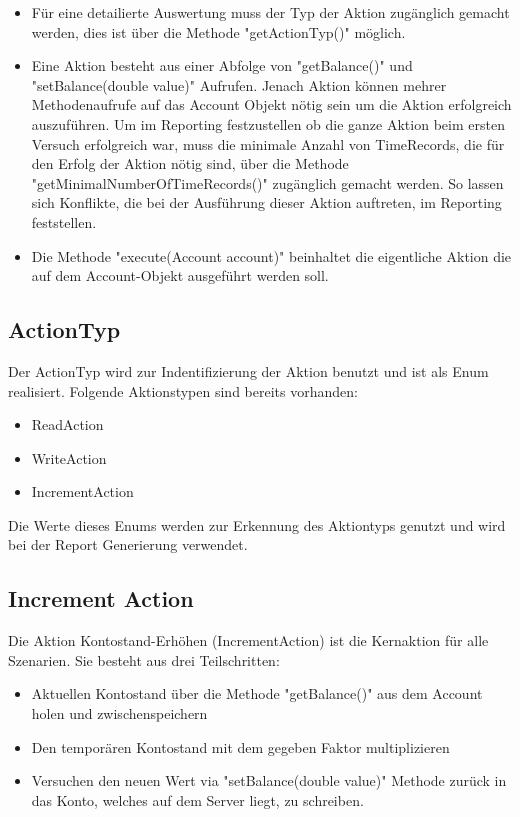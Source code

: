 \begin{itemize}
\item Für eine detailierte Auswertung muss der Typ der Aktion zugänglich gemacht werden, dies ist über die Methode "getActionTyp()" möglich.
\item Eine Aktion besteht aus einer Abfolge von "getBalance()" und "setBalance(double value)" Aufrufen. Jenach Aktion können mehrer Methodenaufrufe auf das Account Objekt nötig sein um die Aktion erfolgreich auszuführen. Um im Reporting festzustellen ob die ganze Aktion beim ersten Versuch erfolgreich war, muss die minimale Anzahl von TimeRecords, die für den Erfolg der Aktion nötig sind, über die Methode "getMinimalNumberOfTimeRecords()" zugänglich gemacht werden. So lassen sich Konflikte, die bei der Ausführung dieser Aktion auftreten, im Reporting feststellen.
\item Die Methode "execute(Account account)" beinhaltet die eigentliche Aktion die auf dem Account-Objekt ausgeführt werden soll.
\end{itemize} 

\subsection{ActionTyp}
\label{sec:actionTyp}
Der ActionTyp wird zur Indentifizierung der Aktion benutzt und ist als Enum realisiert. Folgende Aktionstypen sind bereits vorhanden:
\begin{itemize}
\item ReadAction
\item WriteAction
\item IncrementAction
\end{itemize}
Die Werte dieses Enums werden zur Erkennung des Aktiontyps genutzt und wird bei der Report Generierung verwendet.

 
\subsection{Increment Action}
\label{sec:incrementAction}
Die Aktion Kontostand-Erhöhen (IncrementAction) ist die Kernaktion für alle Szenarien. 
Sie besteht aus drei Teilschritten:
\begin{itemize}
\item Aktuellen Kontostand über die Methode "getBalance()" aus dem Account holen und zwischenspeichern
\item Den temporären Kontostand mit dem gegeben Faktor multiplizieren
\item Versuchen den neuen Wert via "setBalance(double value)" Methode zurück in das Konto, welches auf dem Server liegt, zu schreiben. 
\end{itemize}

